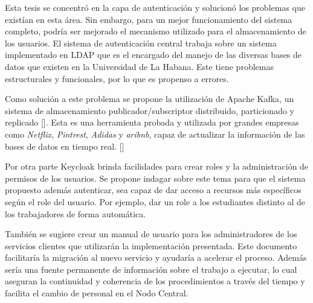 \begin{recomendations}
	Esta tesis se concentró en la capa de autenticación y solucionó los problemas que existían  en esta área. Sin embargo, para un mejor funcionamiento del sistema completo, podría ser mejorado el mecanismo utilizado para el almacenamiento de los usuarios. El sistema de autenticación central trabaja sobre un sistema implementado en LDAP que es el encargado del manejo de las diversas bases de datos que existen en la Universidad de La Habana. Este tiene problemas estructurales y funcionales, por lo que es propenso a errores. 
    
     Como solución a este problema se propone la utilización de Apache Kafka, un sistema de almacenamiento publicador/subscriptor distribuido, particionado y replicado [\cite{gallegos2015aplicacion}]. Esta es una herramienta probada y utilizada por grandes empresas como \textit{Netflix}, \textit{Pintrest}, \textit{Adidas} y \textit{aribnb}, capaz de actualizar la información de las bases de datos en tiempo real. [\cite{apacheApacheKafka}]
     
     Por otra parte Keycloak brinda facilidades para crear roles y la administración de permisos de los usuarios. Se propone indagar sobre este tema para que el sistema propuesto además autenticar, sea capaz de dar acceso a recursos más específicos según el role del usuario. Por ejemplo, dar un role a los estudiantes distinto al de los trabajadores de forma automática.
     
     También se sugiere crear un manual de usuario para los administradores de los servicios clientes que utilizarán la implementación presentada. Este documento facilitaría la migración al nuevo servicio y ayudaría a acelerar el proceso. Además sería una fuente permanente de información sobre el trabajo a ejecutar, lo cual aseguran la continuidad y coherencia de los procedimientos a través del tiempo y facilita el cambio de personal en el Nodo Central.
     
     
     
     
\end{recomendations}
